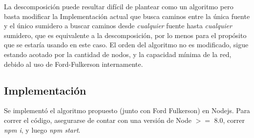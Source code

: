 \documentclass{article}
\begin{document}
La descomposición puede resultar difícil de plantear como un algoritmo pero basta modificar la Implementación actual que busca caminos entre la única fuente y el único sumidero a buscar caminos desde \textit{cualquier} fuente hasta \textit{cualquier} sumidero, que es equivalente a la descomposición, por lo menos para el propósito que se estaría usando en este caso. El orden del algoritmo no es modificado, sigue estando acotado por la cantidad de nodos, y la capacidad mínima de la red, debido al uso de Ford-Fulkerson internamente.

\subsection{Implementación}

Se implementó el algoritmo propuesto (junto con Ford Fulkerson) en Nodejs. Para correr el código, asegurarse de contar con una versión de Node $>=$ 8.0, correr \textit{npm i}, y luego \textit{npm start}.

\newpage
\end{document}
